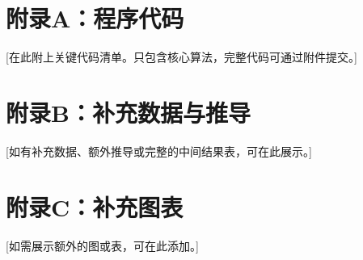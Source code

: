 
\section{附录A：程序代码}


[在此附上关键代码清单。只包含核心算法，完整代码可通过附件提交。]

\section{附录B：补充数据与推导}

[如有补充数据、额外推导或完整的中间结果表，可在此展示。]

\section{附录C：补充图表}

[如需展示额外的图或表，可在此添加。]
